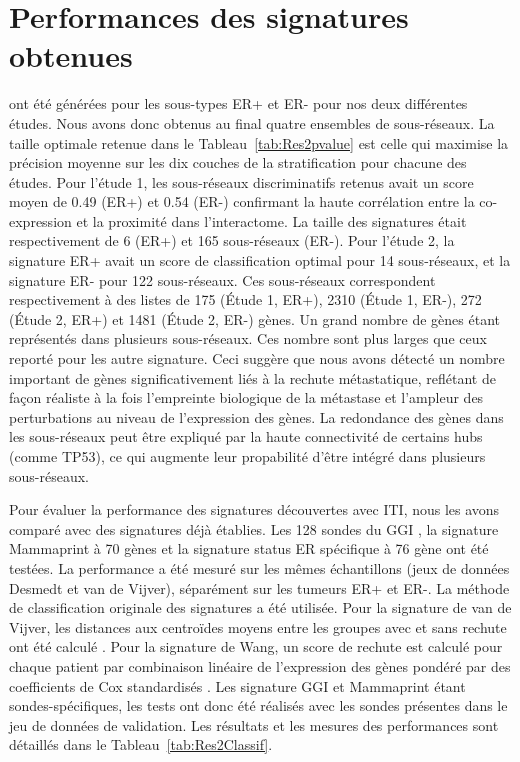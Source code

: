 		\section{\textcolor{green!45!black}{Performances des signatures obtenues}}
		 ont été générées pour les sous-types ER+ et ER- pour nos deux différentes études.
		Nous avons donc obtenus au final quatre ensembles de sous-réseaux.
		La taille optimale retenue dans le Tableau~\ref{tab:Res2pvalue} est celle qui maximise la précision moyenne sur les dix couches de la stratification pour chacune des études.
		Pour l'étude 1, les sous-réseaux discriminatifs retenus avait un score moyen de 0.49 (ER+) et 0.54 (ER-) confirmant la haute corrélation entre la co-expression et la proximité dans l'interactome.
		La taille des signatures était respectivement de 6 (ER+) et 165 sous-réseaux (ER-).
		Pour l'étude 2, la signature ER+ avait un score de classification optimal pour 14 sous-réseaux, et la signature ER- pour 122 sous-réseaux.
		Ces sous-réseaux correspondent respectivement à des listes de 175 (Étude 1, ER+), 2310 (Étude 1, ER-), 272 (Étude 2, ER+) et 1481 (Étude 2, ER-) gènes.
		Un grand nombre de gènes étant représentés dans plusieurs sous-réseaux.
		Ces nombre sont plus larges que ceux reporté pour les autre signature.
		Ceci suggère que nous avons détecté un nombre important de gènes significativement liés à la rechute métastatique, reflétant de façon réaliste à la fois l'empreinte biologique de la métastase et l'ampleur des perturbations au niveau de l'expression des gènes.
		La redondance des gènes dans les sous-réseaux peut être expliqué par la haute connectivité de certains hubs (comme \acs{TP53}), ce qui augmente leur propabilité d'être intégré dans plusieurs sous-réseaux.

		Pour évaluer la performance des signatures découvertes avec ITI, nous les avons comparé avec des signatures déjà établies.
		Les 128 sondes du \acs{GGI} \citet{Sotiriou2006}, la signature Mammaprint à 70 gènes \citet{vandevijver2002} et la signature status ER spécifique à 76 gène \citet{Wang2005} ont été testées.
		La performance a été mesuré sur les mêmes échantillons (jeux de données Desmedt et van de Vijver), séparément sur les tumeurs ER+ et ER-.
		La méthode de classification originale des signatures a été utilisée.
		Pour la signature de van de Vijver, les distances aux centroïdes moyens entre les groupes avec et sans rechute ont été calculé \citet{vandevijver2002}.
		Pour la signature de Wang, un score de rechute est calculé pour chaque patient par combinaison linéaire de l'expression des gènes pondéré par des coefficients de Cox standardisés \citet{Wang2005}.
		Les signature GGI et Mammaprint étant sondes-spécifiques, les tests ont donc été réalisés avec les sondes présentes dans le jeu de données de validation.
		Les résultats et les mesures des performances sont détaillés dans le Tableau~\ref{tab:Res2Classif}.

